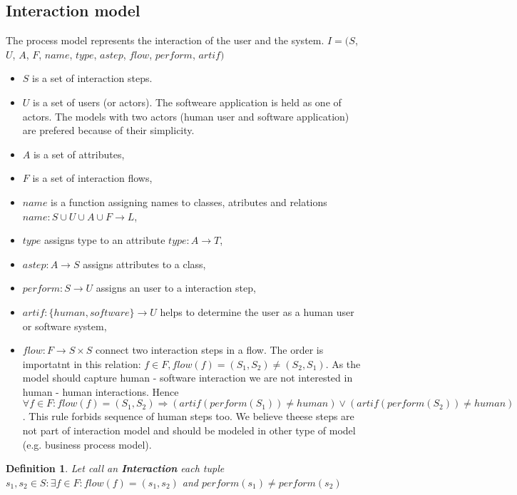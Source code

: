 \documentclass[10pt,a4paper]{article}
\newtheorem{mydef}{Definition}
\begin{document}
\subsection{Interaction model}
The process model represents the interaction of the user and the system.
$I=(S$, $U$, $A$, $F$, $name$, $type$, $astep$, $flow$, $perform$, $artif)$
\begin{itemize}
	\item $S$ is a set of interaction steps. 
	\item $U$ is a set of users (or actors). The softweare application is held as one of actors. The models with two actors (human user and software application) are prefered because of their simplicity. 
	\item $A$ is a set of attributes,
	\item $F$ is a set of interaction flows,
	\item $name$ is a function assigning names to classes, atributes and relations $name: S \cup U \cup A \cup F \rightarrow L$,
	\item $type$ assigns type to an attribute $type: A \rightarrow T$,
	\item $astep: A \rightarrow S$ assigns attributes to a class,
	\item $perform: S \rightarrow U$ assigns an user to a interaction step,
	\item $artif: \lbrace human, software \rbrace \rightarrow U$ helps to determine the user as a human user or software system,
	\item $flow: F \rightarrow S \times S$ connect two interaction steps in a flow. The order is importatnt in this relation: $f \in F, flow(f)=(S_1, S_2)\neq(S_2, S_1)$.  As the model should capture human - software interaction we are not interested in human - human interactions. Hence $\forall f \in F: flow(f)=(S_1,S_2) \Rightarrow (artif(perform(S_1)) \neq human) \vee (artif(perform(S_2))\neq human) $. This rule forbids sequence of human steps too. We believe theese steps are not part of interaction model and should be modeled in other type of model (e.g. business process model).
 
\end{itemize}

\begin{mydef}
Let call an \textbf{Interaction} each tuple $s_1, s_2 \in S: \exists f \in F: flow(f)=(s_1,s_2) $ and  $perform(s_1) \neq perform(s_2)$ 
\end{mydef}
\end{document}
